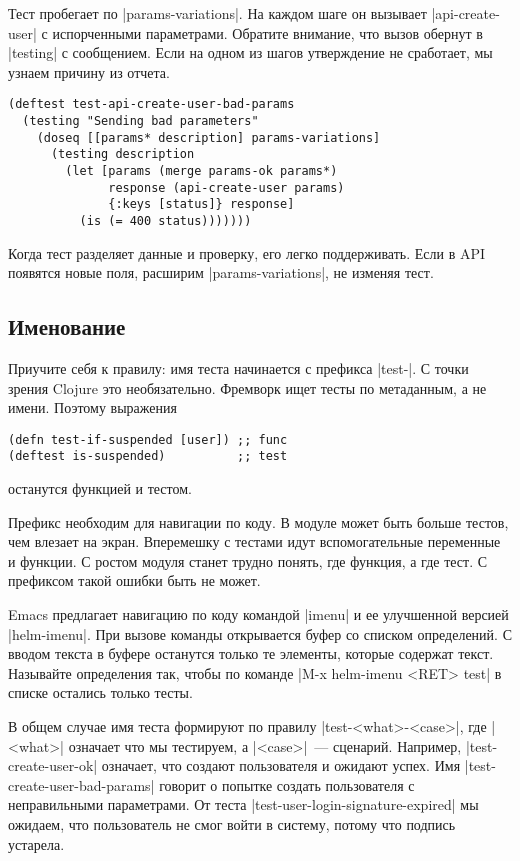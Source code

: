 Тест пробегает по \spverb|params-variations|. На каждом шаге он вызывает
\spverb|api-create-user| с испорченными параметрами. Обратите внимание, что
вызов обернут в \spverb|testing| с сообщением. Если на одном из шагов
утверждение не сработает, мы узнаем причину из отчета.

\begin{verbatim}
(deftest test-api-create-user-bad-params
  (testing "Sending bad parameters"
    (doseq [[params* description] params-variations]
      (testing description
        (let [params (merge params-ok params*)
              response (api-create-user params)
              {:keys [status]} response]
          (is (= 400 status)))))))
\end{verbatim}

Когда тест разделяет данные и проверку, его легко поддерживать. Если в API
появятся новые поля, расширим \spverb|params-variations|, не изменяя тест.

\subsection{Именование}

Приучите себя к правилу: имя теста начинается с префикса \spverb|test-|. С точки
зрения Clojure это необязательно. Фремворк ищет тесты по метаданным, а не
имени. Поэтому выражения

\begin{verbatim}
(defn test-if-suspended [user]) ;; func
(deftest is-suspended)          ;; test
\end{verbatim}

\noindent
останутся функцией и тестом.

Префикс необходим для навигации по коду. В модуле может быть больше тестов, чем
влезает на экран. Вперемешку с тестами идут вспомогательные переменные и
функции. С ростом модуля станет трудно понять, где функция, а где тест. С
префиксом такой ошибки быть не может.

Emacs предлагает навигацию по коду командой \spverb|imenu| и ее улучшенной
версией \spverb|helm-imenu|. При вызове команды открывается буфер со списком
определений. С вводом текста в буфере останутся только те элементы, которые
содержат текст. Называйте определения так, чтобы по команде
\spverb|M-x helm-imenu <RET> test| в списке остались только тесты.

В общем случае имя теста формируют по правилу \spverb|test-<what>-<case>|, где
\spverb|<what>| означает что мы тестируем, а \spverb|<case>|~---
сценарий. Например, \spverb|test-create-user-ok| означает, что создают
пользователя и ожидают успех. Имя \spverb|test-create-user-bad-params| говорит о
попытке создать пользователя с неправильными параметрами. От теста
\spverb|test-user-login-signature-expired| мы ожидаем, что пользователь не смог
войти в систему, потому что подпись устарела.

